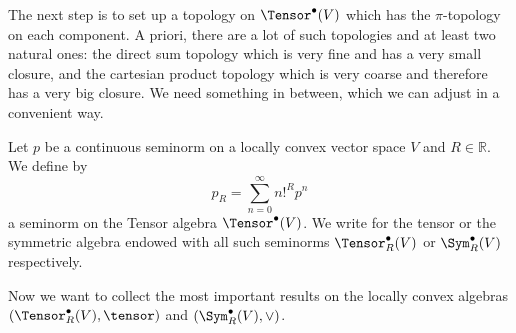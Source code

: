 The next step is to set up a topology on $\Tensor^{\bullet}(V)$ which 
has the $\pi$-topology on each component. A priori, there are a lot of such 
topologies and at least two natural ones: the direct sum topology which is 
very fine and has a very small closure, and the cartesian product topology 
which is very coarse and therefore has a very big closure. We need something 
in between, which we can adjust in a convenient way.
\begin{definition}
	Let $p$ be a continuous seminorm on a locally convex vector space 
	$V$ and $R \in \mathbb{R}$. We define by 
	\begin{equation*}
		p_R 
		= 
		\sum\limits_{n=0}^{\infty}
		n!^R p^n
	\end{equation*}
	a seminorm on the Tensor algebra $\Tensor^{\bullet}(V)$. We write for 
	the tensor or the symmetric algebra endowed with all such seminorms  
	$\Tensor_R^{\bullet}(V)$ or $\Sym_R^{\bullet}(V)$ respectively.
\end{definition}
Now we want to collect the most important results on the locally convex 
algebras $\left( \Tensor_R^{\bullet}(V), \tensor \right)$ and $\left( 
\Sym_R^{\bullet}(V), \vee \right)$. 
